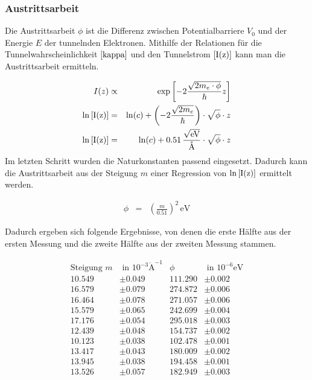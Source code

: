 \documentclass[12pt,a4paper]{scrartcl}
\numberwithin{equation}{section} %
\begin{document}
\hypertarget{austrittsarbeit-1}{%
\subsubsection{Austrittsarbeit}\label{austrittsarbeit-1}}

Die Austrittsarbeit $\phi$ ist die Differenz zwischen
Potentialbarriere $V_0$ und der Energie $E$ der tunnelnden
Elektronen. Mithilfe der Relationen für die Tunnelwahrscheinlichkeit
$\eqref{kappa}$ und den Tunnelstrom $\eqref{I(z)}$ kann man die
Austrittsarbeit ermitteln.

\begin{eqnarray}
    I(z) &\propto& \exp\left[-2\frac{\sqrt{2m_e\cdot \phi}}{\hbar} z\right] \\
    \ln\eqref{I(z)}
        &=& \ln(c)
            + \left(-2\frac{\sqrt{2m_e}}{\hbar}\right)
            \cdot \sqrt{\phi} \cdot z \\
    \ln\eqref{I(z)} &=& \ln(c) + 0.51 \mathrm{\,\frac{\sqrt{eV}}{\mathrm{\mathring{A}}}}\cdot \sqrt{\phi} \cdot z
\end{eqnarray}
Im letzten Schritt wurden die Naturkonstanten passend eingesetzt.
\cite{Anleitung} Dadurch kann die Austrittsarbeit aus der Steigung $m$ einer
Regression von $\ln\eqref{I(z)}$ ermittelt werden.

\begin{eqnarray}
    \phi &=& \left(\frac{m}{0.51}\right)^2 \mathrm{\,eV}
\end{eqnarray}

Dadurch ergeben sich folgende Ergebnisse, von denen die erste Hälfte aus
der ersten Messung und die zweite Hälfte aus der zweiten Messung
stammen.

\begin{align*}
    \text{Steigung } m &\text{ in } 10^{-3}\mathrm{\mathring A}^{-1}
        & \phi &\text{ in } 10^{-6}\mathrm{eV} \\
    10.549 &\pm 0.049 & 111.290 &\pm 0.002 \\
    16.579 &\pm 0.079 & 274.872 &\pm 0.006 \\
    16.464 &\pm 0.078 & 271.057 &\pm 0.006 \\
    15.579 &\pm 0.065 & 242.699 &\pm 0.004 \\
    17.176 &\pm 0.054 & 295.018 &\pm 0.003 \\
    12.439 &\pm 0.048 & 154.737 &\pm 0.002 \\
    10.123 &\pm 0.038 & 102.478 &\pm 0.001 \\
    13.417 &\pm 0.043 & 180.009 &\pm 0.002 \\
    13.945 &\pm 0.038 & 194.458 &\pm 0.001 \\
    13.526 &\pm 0.057 & 182.949 &\pm 0.003
\end{align*}
\end{document}

